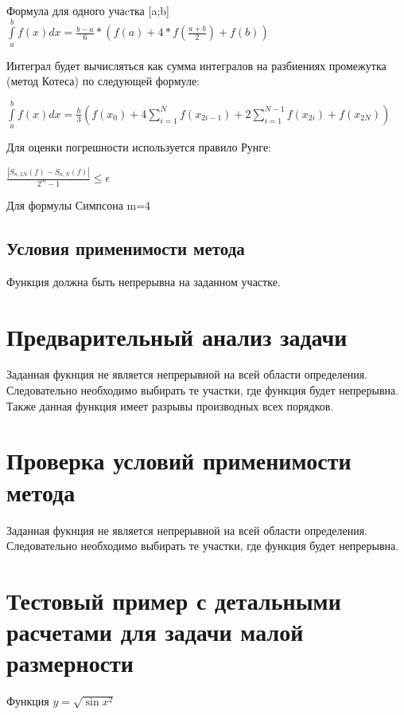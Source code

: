 Формула для одного учаcтка [a;b]
\begin{math} 
	\int\limits_{a}^{b}f(x)dx=\frac{b-a}{6}*(f(a)+4*f(\frac{a+b}{2})+f(b))
\end{math}


Интеграл будет вычисляться как сумма интегралов на разбиениях промежутка (метод Котеса) по следующей формуле:

\begin{math} 
	\int\limits_{a}^{b}f(x)dx=\frac{h}{3}(f(x_{0})+4\sum\limits_{i=1}^{N}f(x_{2i-1})+2\sum\limits_{i=1}^{N-1}f(x_{2i})+f(x_{2N}))
\end{math}

Для оценки погрешности используется правило Рунге:

\begin{math} 
	\frac{|S_{n,2N}(f)-S_{n,N}(f)|}{2^{m}-1} \leq \epsilon
\end{math}

Для формулы Симпсона m=4

\subsection{Условия применимости метода}

Функция должна быть непрерывна на заданном участке.

\section{Предварительный анализ задачи}

Заданная фукнция не является непрерывной на всей области определения. Следовательно необходимо выбирать те участки, где функция будет непрерывна. Также данная функция имеет разрывы производных всех порядков. 

\section{Проверка условий применимости метода}

Заданная фукнция не является непрерывной на всей области определения. Следовательно необходимо выбирать те участки, где функция будет непрерывна. 

\section{Тестовый пример с детальными расчетами для задачи малой размерности}

Функция \begin{math} 
	y=\sqrt{\sin{x^{2}}}
\end{math}

